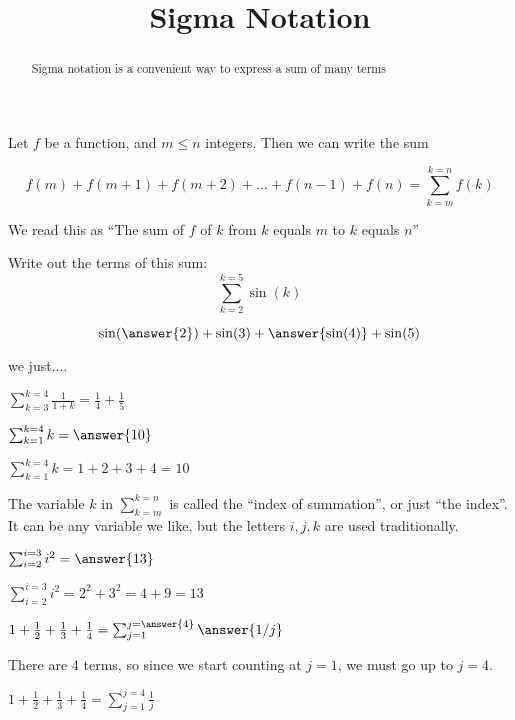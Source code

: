 \documentclass{ximera}
\title[Dig-In:]{Sigma Notation}
\begin{document}
\begin{abstract}
	Sigma notation is a convenient way to express a sum of many terms
\end{abstract}

\begin{definition}
	Let $f$ be a function, and $m \leq n$ integers.  Then we can write the sum 
	
	\[ f(m)+f(m+1)+f(m+2)+...+f(n-1)+f(n) = \sum_{k=m}^{k=n} f(k)\] 
	
	We read this as ``The sum of $f$ of $k$ from $k$ equals $m$ to $k$ equals $n$''
	
	\end{definition}

\begin{example}
  Write out the terms of this sum:
  \[
  \sum_{k=2}^{k=5} \sin(k)
  \]
  \begin{explanation}
  \begin{prompt}
    \[
    \sin(\answer{2}) + \sin(3) + \answer{\sin(4)} + \sin(5)
    \]
  \end{prompt}
  \begin{feedback}
    we just....
  \end{feedback}
  \end{explanation}
\end{example}

\begin{example}
$\sum_{k=3}^{k=4} \frac{1}{1+k} = \frac{1}{4}+\frac{1}{5}$
\end{example}

\begin{question}
	$\sum_{k=1}^{k=4} k  = \answer{10}$
	\begin{hint}
		$\sum_{k=1}^{k=4} k  = 1+2+3+4=10$
	\end{hint}
\end{question}

The variable $k$ in $\sum_{k=m}^{k=n}$ is called the ``index of summation'', or just ``the index''.  It can be any variable we like, but the letters $i,j,k$ are used traditionally.

\begin{question}
$\sum_{i=2}^{i=3} i^2  = \answer{13}$
\begin{hint}
	$\sum_{i=2}^{i=3} i^2  = 2^2+3^2 = 4+9=13$
\end{hint}
\end{question}

\begin{question}
	$1+\frac{1}{2} + \frac{1}{3} + \frac{1}{4} = \sum_{j=1}^{j= \answer{4}} \answer{1/j}$
	\begin{hint}
		There are $4$ terms, so since we start counting at $j=1$, we must go up to $j=4$.
	\end{hint}
	\begin{hint}
		$1+\frac{1}{2} + \frac{1}{3} + \frac{1}{4} = \sum_{j=1}^{j= 4} \frac{1}{j}$
	\end{hint}
\end{question}
\end{document}
